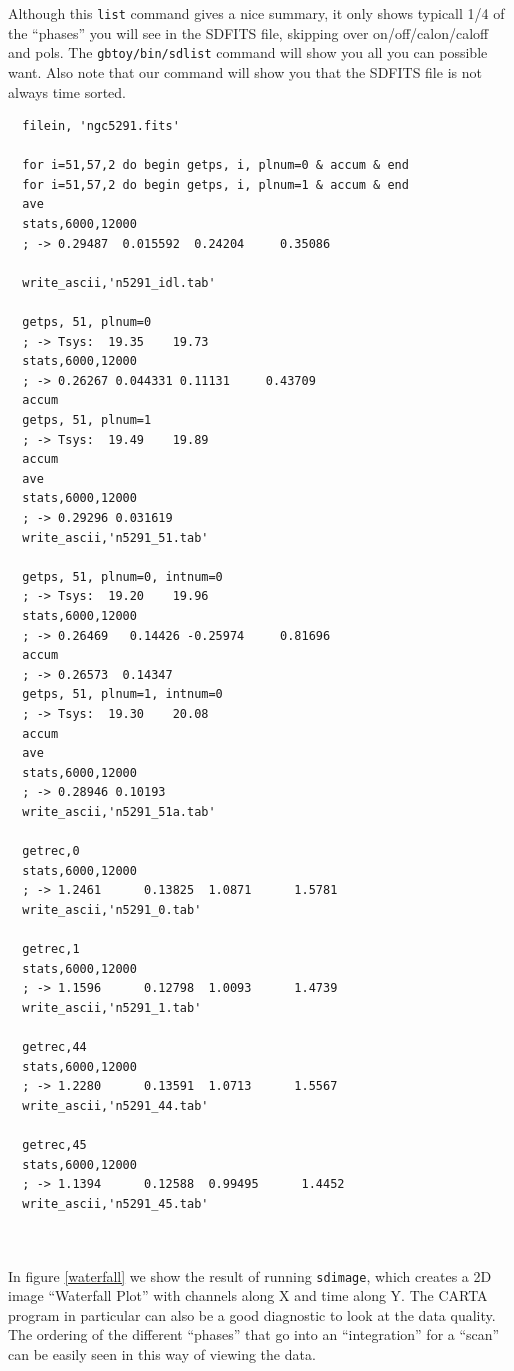 \documentclass[12pt,a4paper]{article}
\begin{document}
Although this {\tt list} command gives a nice summary, it only shows typicall 1/4 of the ``phases'' you will see
in the SDFITS file, skipping over on/off/calon/caloff and pols.
The {\tt gbtoy/bin/sdlist} command will show you all you can possible want. Also note that our command will show you
that the SDFITS file is not always time sorted.


\begin{lstlisting}
  filein, 'ngc5291.fits'
  
  for i=51,57,2 do begin getps, i, plnum=0 & accum & end  
  for i=51,57,2 do begin getps, i, plnum=1 & accum & end
  ave
  stats,6000,12000
  ; -> 0.29487  0.015592  0.24204     0.35086

  write_ascii,'n5291_idl.tab'

  getps, 51, plnum=0
  ; -> Tsys:  19.35    19.73
  stats,6000,12000
  ; -> 0.26267 0.044331 0.11131     0.43709
  accum
  getps, 51, plnum=1
  ; -> Tsys:  19.49    19.89
  accum
  ave
  stats,6000,12000
  ; -> 0.29296 0.031619
  write_ascii,'n5291_51.tab'

  getps, 51, plnum=0, intnum=0
  ; -> Tsys:  19.20    19.96
  stats,6000,12000
  ; -> 0.26469   0.14426 -0.25974     0.81696
  accum
  ; -> 0.26573  0.14347
  getps, 51, plnum=1, intnum=0
  ; -> Tsys:  19.30    20.08
  accum
  ave
  stats,6000,12000
  ; -> 0.28946 0.10193
  write_ascii,'n5291_51a.tab'

  getrec,0
  stats,6000,12000
  ; -> 1.2461      0.13825  1.0871      1.5781
  write_ascii,'n5291_0.tab'
  
  getrec,1
  stats,6000,12000  
  ; -> 1.1596      0.12798  1.0093      1.4739
  write_ascii,'n5291_1.tab'
  
  getrec,44
  stats,6000,12000  
  ; -> 1.2280      0.13591  1.0713      1.5567
  write_ascii,'n5291_44.tab'

  getrec,45
  stats,6000,12000  
  ; -> 1.1394      0.12588  0.99495      1.4452
  write_ascii,'n5291_45.tab'
  
  
\end{lstlisting}






In figure \ref{waterfall} we show the result of running {\tt sdimage}, which creates a 2D image ``Waterfall Plot''
with channels along X and time along Y. The CARTA program in particular can also be a good diagnostic to look at the data quality.
The ordering of the  different ``phases'' that go into an ``integration'' for a ``scan'' can be easily seen
in this way of viewing the data.
\end{document}
